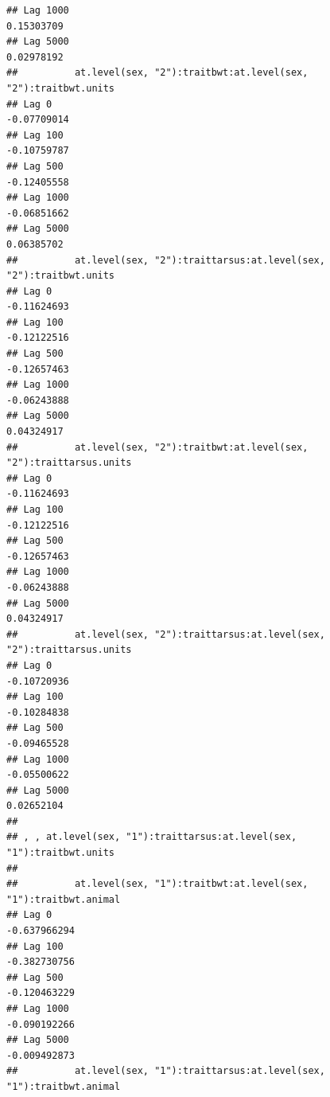 \documentclass[
  12pt,
]{book}
\begin{document}
\begin{verbatim}
## Lag 1000                                                          0.15303709
## Lag 5000                                                          0.02978192
##          at.level(sex, "2"):traitbwt:at.level(sex, "2"):traitbwt.units
## Lag 0                                                      -0.07709014
## Lag 100                                                    -0.10759787
## Lag 500                                                    -0.12405558
## Lag 1000                                                   -0.06851662
## Lag 5000                                                    0.06385702
##          at.level(sex, "2"):traittarsus:at.level(sex, "2"):traitbwt.units
## Lag 0                                                         -0.11624693
## Lag 100                                                       -0.12122516
## Lag 500                                                       -0.12657463
## Lag 1000                                                      -0.06243888
## Lag 5000                                                       0.04324917
##          at.level(sex, "2"):traitbwt:at.level(sex, "2"):traittarsus.units
## Lag 0                                                         -0.11624693
## Lag 100                                                       -0.12122516
## Lag 500                                                       -0.12657463
## Lag 1000                                                      -0.06243888
## Lag 5000                                                       0.04324917
##          at.level(sex, "2"):traittarsus:at.level(sex, "2"):traittarsus.units
## Lag 0                                                            -0.10720936
## Lag 100                                                          -0.10284838
## Lag 500                                                          -0.09465528
## Lag 1000                                                         -0.05500622
## Lag 5000                                                          0.02652104
## 
## , , at.level(sex, "1"):traittarsus:at.level(sex, "1"):traitbwt.units
## 
##          at.level(sex, "1"):traitbwt:at.level(sex, "1"):traitbwt.animal
## Lag 0                                                      -0.637966294
## Lag 100                                                    -0.382730756
## Lag 500                                                    -0.120463229
## Lag 1000                                                   -0.090192266
## Lag 5000                                                   -0.009492873
##          at.level(sex, "1"):traittarsus:at.level(sex, "1"):traitbwt.animal

\end{verbatim}
\end{document}
